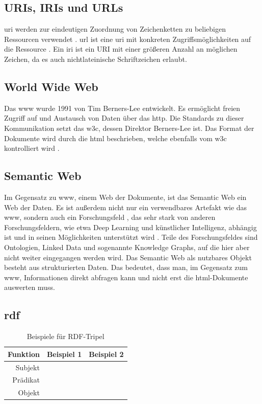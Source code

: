 \subsection{URIs, IRIs und URLs}
\ac{uri} werden zur eindeutigen Zuordnung von Zeichenketten zu beliebigen Ressourcen verwendet \citep{uri}.
\ac{url} ist eine \ac{uri} mit konkreten Zugriffsmöglichkeiten auf die Ressource \citep{url}.
Ein \ac{iri} ist ein URI mit einer größeren Anzahl an möglichen Zeichen, da es auch nichtlateinische Schriftzeichen erlaubt.

\subsection{World Wide Web}
Das \ac{www} wurde 1991 von Tim Berners-Lee entwickelt.
Es ermöglicht freien Zugriff auf und Austausch von Daten über das \ac{http}.
Die Standards zu dieser Kommunikation setzt das \ac{w3c}, dessen Direktor Berners-Lee ist.
Das Format der Dokumente wird durch die \ac{html} beschrieben, welche ebenfalls vom \ac{w3c} kontrolliert wird \citep{www}.

\subsection{Semantic Web}
Im Gegensatz zu \ac{www}, einem Web der Dokumente, ist das Semantic Web ein Web der Daten.
Es ist außerdem nicht nur ein verwendbares Artefakt wie das \ac{www}, sondern auch ein Forschungsfeld \citep{semanticwebreview},
das sehr stark von anderen Forschungsfeldern, wie etwa Deep Learning und künstlicher Intelligenz,
abhängig ist und in seinen Möglichkeiten unterstützt wird \citep{semanticwebdeeplearning}.
Teile des Forschungsfeldes sind Ontologien, Linked Data und sogenannte Knowledge Graphs, auf die hier aber nicht weiter eingegangen werden wird.
Das Semantic Web als nutzbares Objekt besteht aus strukturierten Daten.
Das bedeutet, dass man, im Gegensatz zum \ac{www}, Informationen direkt abfragen kann und nicht erst die \ac{html}-Dokumente auswerten muss.

\subsection[RDF]{\acf*{rdf}}
\begin{table}[h]\centering\small
  \begin{tabulary}{\textwidth}{rrl}
    \toprule
    Funktion & Beispiel 1 & Beispiel 2 \\
    \midrule
    Subjekt   &       &             \\
    Prädikat  &  &                       \\
    Objekt    &                &   \\
    \bottomrule
  \end{tabulary}
  \caption{Beispiele für RDF-Tripel}
  \label{tab:rdftripleexample}
\end{table}

